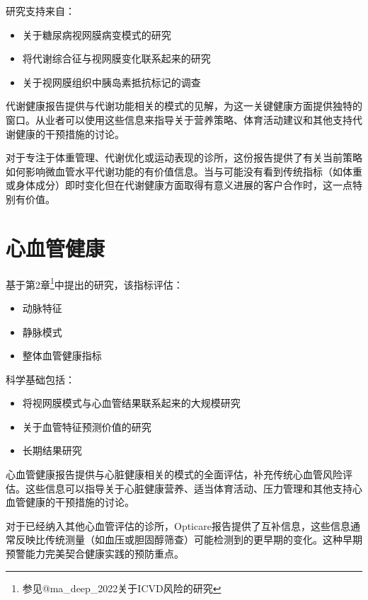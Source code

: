 \documentclass[
  Letterpaper,
]{scrbook}
\providecommand{\tightlist}{%
  \setlength{\itemsep}{0pt}\setlength{\parskip}{0pt}}\usepackage{longtable,booktabs,array}
\begin{document}
研究支持来自：

\begin{itemize}
\tightlist
\item
  关于糖尿病视网膜病变模式的研究
\item
  将代谢综合征与视网膜变化联系起来的研究
\item
  关于视网膜组织中胰岛素抵抗标记的调查
\end{itemize}

代谢健康报告提供与代谢功能相关的模式的见解，为这一关键健康方面提供独特的窗口。从业者可以使用这些信息来指导关于营养策略、体育活动建议和其他支持代谢健康的干预措施的讨论。

对于专注于体重管理、代谢优化或运动表现的诊所，这份报告提供了有关当前策略如何影响微血管水平代谢功能的有价值信息。当与可能没有看到传统指标（如体重或身体成分）即时变化但在代谢健康方面取得有意义进展的客户合作时，这一点特别有价值。

\section{心血管健康}\label{ux5fc3ux8840ux7ba1ux5065ux5eb7}

基于第2章\footnote{参见@ma\_deep\_2022关于ICVD风险的研究}中提出的研究，该指标评估：

\begin{itemize}
\tightlist
\item
  动脉特征
\item
  静脉模式
\item
  整体血管健康指标
\end{itemize}

科学基础包括：

\begin{itemize}
\tightlist
\item
  将视网膜模式与心血管结果联系起来的大规模研究
\item
  关于血管特征预测价值的研究
\item
  长期结果研究
\end{itemize}

心血管健康报告提供与心脏健康相关的模式的全面评估，补充传统心血管风险评估。这些信息可以指导关于心脏健康营养、适当体育活动、压力管理和其他支持心血管健康的干预措施的讨论。

对于已经纳入其他心血管评估的诊所，Opticare报告提供了互补信息，这些信息通常反映比传统测量（如血压或胆固醇筛查）可能检测到的更早期的变化。这种早期预警能力完美契合健康实践的预防重点。
\end{document}
